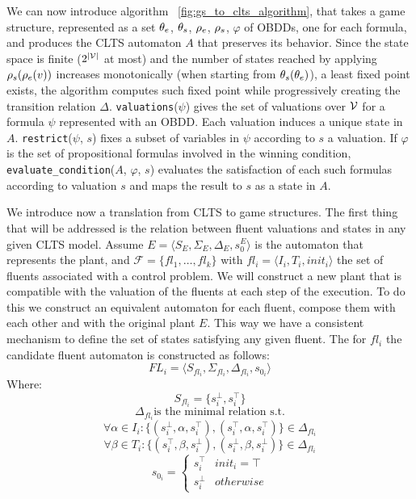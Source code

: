 We can now introduce algorithm ~\ref{fig:gs_to_clts_algorithm}, that takes a game structure, represented as a set 
${\theta_e}$, ${\theta_s}$, ${\rho_e}$, ${\rho_s}$, $\varphi$ of OBDDs, one for each formula, and produces the CLTS automaton $A$ that preserves its behavior. Since the state space is finite ($2^{|{\mathcal{V}}|}$ at most) and the number of states reached by applying ${\rho_s}({\rho_e}(v))$ increases monotonically (when starting from ${\theta_s}({\theta_e})$), a least fixed point exists, the algorithm computes such fixed point while progressively creating the transition relation $\Delta$. \texttt{valuations}($\psi$) gives the set of valuations over ${\mathcal{V}}$ for a formula $\psi$ represented with an OBDD. Each valuation induces a unique state in $A$. \texttt{restrict}($\psi$, $s$) fixes a subset of variables in $\psi$ according to $s$ a valuation. If $\varphi$ is the set of propositional formulas involved in the winning condition, \texttt{evaluate\_condition}($A$, $\varphi$, $s$) evaluates the satisfaction of each such formulas according to valuation $s$ and maps the result to $s$ as a state in $A$.
\newpage


\newpage


We introduce now a translation from CLTS to game structures.
The first thing that will be addressed is the relation between fluent valuations and states in any given CLTS model. Assume $E = \langle S_E, \Sigma_E, \Delta_E, s^E_0 \rangle$ is the automaton that represents the plant, and $\mathcal{F}=\{fl_1,\ldots,fl_k\}$ with $fl_i = \langle I_i, T_i, init_i \rangle$ the set of fluents associated with a control problem. We will construct a new plant that is compatible with the valuation of the fluents at each step of the execution. To do this we construct an equivalent automaton for each fluent, compose them with each other and with the original plant $E$. This way we have a consistent mechanism to define the set of states satisfying any given fluent.  The for $fl_i$ the candidate fluent automaton is constructed as follows:
\[ FL_i = \langle S_{fl_i}, \Sigma_{fl_i}, \Delta_{fl_i}, s_{0_i}\rangle \]
Where:
\[S_{fl_i}= \{s^{\bot}_i, s^{\top}_i\} \]
\[\Delta_{fl_i} \text{is the minimal relation s.t.}\]
\[ \forall \alpha \in I_i: \{(s^{\bot}_i,\alpha,s^{\top}_i), (s^{\top}_i,\alpha,s^{\top}_i)\} \in \Delta_{fl_i} \]
\[ \forall \beta \in T_i: \{(s^{\top}_i,\beta,s^{\bot}_i), (s^{\bot}_i,\beta,s^{\bot}_i)\} \in \Delta_{fl_i} \]
\[
s_{0_i} = \begin{cases}
s^{\top}_i & init_i = \top \\
s^{\bot}_i & otherwise
\end{cases}
\]

